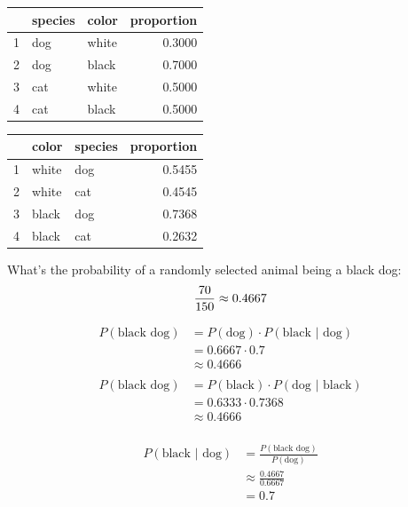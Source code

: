 \documentclass[landscape]{exam}
\begin{document}
  \begin{table}[ht]
    \begin{tabular}{rllr}
      \toprule
         & species & color & proportion \\
      \midrule
      1  & dog     & white & 0.3000 \\
      2  & dog     & black & 0.7000 \\
      \midrule
      3  & cat     & white & 0.5000 \\
      4  & cat     & black & 0.5000 \\
      \bottomrule
    \end{tabular}
  \end{table}

  \begin{table}[ht]
    \begin{tabular}{rllr}
      \toprule
         & color & species & proportion \\
      \midrule
      1  & white & dog     & 0.5455 \\
      2  & white & cat     & 0.4545 \\
      \midrule
      3  & black & dog     & 0.7368 \\
      4  & black & cat     & 0.2632 \\
      \bottomrule
    \end{tabular}
  \end{table}

  What's the probability of a randomly selected animal being a black dog:
  \[
    \frac{70}{150} \approx 0.4667 \\
  \]

  \begin{align*}
    P(\text{black dog}) & = P(\text{dog}) \cdot P(\text{black } | \text{ dog}) \\
                        & = 0.6667 \cdot 0.7 \\
                        & \approx 0.4666 \\
                        \\
    P(\text{black dog}) & = P(\text{black}) \cdot P(\text{dog } | \text{ black}) \\
                        & = 0.6333 \cdot 0.7368 \\
                        & \approx 0.4666 \\
  \end{align*}

  \begin{align*}
    P(\text{black } | \text{ dog}) & = \frac{P(\text{black dog})}{P(\text{dog})} \\
                                   & \approx \frac{0.4667}{0.6667} \\
                                   & = 0.7 \\
  \end{align*}
\end{document}
